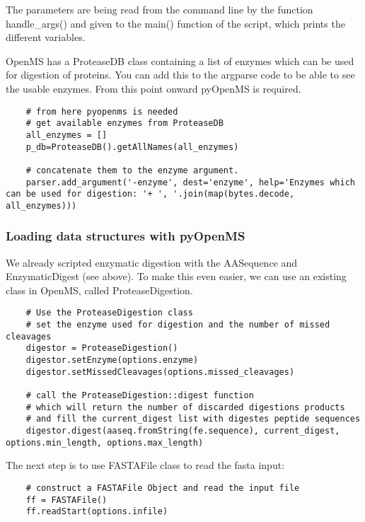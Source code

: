 {\noindent The parameters are being read from the command line by the function handle\_args() and given to the main() function of the script, which prints the different variables.

\noindent OpenMS has a ProteaseDB  class containing a list of enzymes which can be used for digestion of proteins. You can add this to the argparse code to be able to see the usable enzymes. From this point onward pyOpenMS is required. 
\begin{code}
\begin{verbatim}
    # from here pyopenms is needed
    # get available enzymes from ProteaseDB
    all_enzymes = []
    p_db=ProteaseDB().getAllNames(all_enzymes)
    
    # concatenate them to the enzyme argument.
    parser.add_argument('-enzyme', dest='enzyme', help='Enzymes which can be used for digestion: '+ ', '.join(map(bytes.decode, all_enzymes)))
\end{verbatim}
\end{code}

\subsubsection{Loading data structures with pyOpenMS}
We already scripted enzymatic digestion with the AASequence and EnzymaticDigest (see above). To make this even easier, we can use an existing class in OpenMS, called ProteaseDigestion.

\begin{code}
\begin{verbatim}
    # Use the ProteaseDigestion class
    # set the enzyme used for digestion and the number of missed cleavages
    digestor = ProteaseDigestion()
    digestor.setEnzyme(options.enzyme)
    digestor.setMissedCleavages(options.missed_cleavages)
    
    # call the ProteaseDigestion::digest function
    # which will return the number of discarded digestions products  
    # and fill the current_digest list with digestes peptide sequences
    digestor.digest(aaseq.fromString(fe.sequence), current_digest, options.min_length, options.max_length)
\end{verbatim}
\end{code}

\noindent The next step is to use FASTAFile class to read the fasta input:
\begin{code}
\begin{verbatim}
    # construct a FASTAFile Object and read the input file
    ff = FASTAFile()
    ff.readStart(options.infile)
    

\end{verbatim}
\end{code}}
